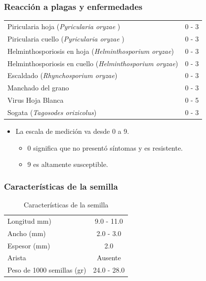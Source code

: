 \documentclass[
  letterpaper,
  DIV=11,
  numbers=noendperiod]{scrartcl}
\begin{document}
\subsubsection{\texorpdfstring{\textbf{Reacción a plagas y
enfermedades}}{Reacción a plagas y enfermedades}}\label{reacciuxf3n-a-plagas-y-enfermedades}

\begin{longtable}[]{@{}lc@{}}
\toprule\noalign{}
\endhead
\bottomrule\noalign{}
\endlastfoot
Piricularia hoja (\emph{Pyricularia oryzae} ) & 0 - 3 \\
Piricularia cuello (\emph{Pyricularia oryzae} ) & 0 - 3 \\
Helminthosporiosis en hoja (\emph{Helminthosporium oryzae}) & 0 - 3 \\
Helminthosporiosis en cuello (\emph{Helminthosporium oryzae}) & 0 - 3 \\
Escaldado (\emph{Rhynchosporium oryzae}) & 0 - 3 \\
Manchado del grano & 0 - 3 \\
Virus Hoja Blanca & 0 - 5 \\
Sogata (\emph{Tagosodes orizicolus}) & 0 - 3 \\
\end{longtable}

\begin{itemize}
\item
  La escala de medición va desde 0 a 9.

  \begin{itemize}
  \item
    0 significa que no presentó síntomas y es resistente.
  \item
    9 es altamente susceptible.
  \end{itemize}
\end{itemize}

\subsubsection{\texorpdfstring{\textbf{Características de la
semilla}}{Características de la semilla}}\label{caracteruxedsticas-de-la-semilla}

\begin{longtable}[]{@{}lc@{}}
\caption{Características de la semilla}\tabularnewline
\toprule\noalign{}
\endfirsthead
\endhead
\bottomrule\noalign{}
\endlastfoot
Longitud mm) & 9.0 - 11.0 \\
Ancho (mm) & 2.0 - 3.0 \\
Espesor (mm) & 2.0 \\
Arista & Ausente \\
Peso de 1000 semillas (gr) & 24.0 - 28.0 \\
\end{longtable}
\end{document}
